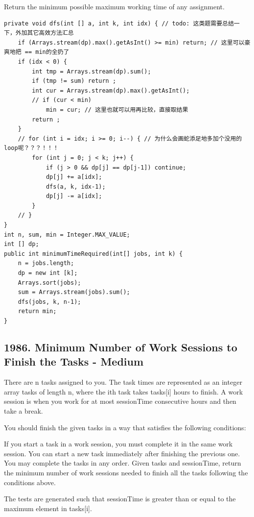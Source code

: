 \documentclass[9pt, b5paaper]{book}
\begin{document}
Return the minimum possible maximum working time of any assignment.
\begin{verbatim}
private void dfs(int [] a, int k, int idx) { // todo: 这类题需要总结一下，外加其它高效方法汇总
    if (Arrays.stream(dp).max().getAsInt() >= min) return; // 这里可以豪爽地把 == min的全扔了
    if (idx < 0) {
        int tmp = Arrays.stream(dp).sum();
        if (tmp != sum) return ;
        int cur = Arrays.stream(dp).max().getAsInt();
        // if (cur < min)
            min = cur; // 这里也就可以用再比较，直接取结果
        return ;
    }
    // for (int i = idx; i >= 0; i--) { // 为什么会画蛇添足地多加个没用的loop呢？？？！！！
        for (int j = 0; j < k; j++) {
            if (j > 0 && dp[j] == dp[j-1]) continue;
            dp[j] += a[idx];
            dfs(a, k, idx-1);
            dp[j] -= a[idx];
        }
    // }
}
int n, sum, min = Integer.MAX_VALUE;
int [] dp;
public int minimumTimeRequired(int[] jobs, int k) {
    n = jobs.length;
    dp = new int [k];
    Arrays.sort(jobs);
    sum = Arrays.stream(jobs).sum();
    dfs(jobs, k, n-1);
    return min;
}
\end{verbatim}
\subsection{1986. Minimum Number of Work Sessions to Finish the Tasks - Medium}
\label{sec-8-0-5}
There are n tasks assigned to you. The task times are represented as an integer array tasks of length n, where the ith task takes tasks[i] hours to finish. A work session is when you work for at most sessionTime consecutive hours and then take a break.

You should finish the given tasks in a way that satisfies the following conditions:

If you start a task in a work session, you must complete it in the same work session.
You can start a new task immediately after finishing the previous one.
You may complete the tasks in any order.
Given tasks and sessionTime, return the minimum number of work sessions needed to finish all the tasks following the conditions above.

The tests are generated such that sessionTime is greater than or equal to the maximum element in tasks[i].
\end{document}
